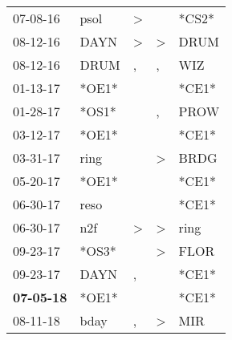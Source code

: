 \begin{supertabular}{p{0.07\textwidth}p{0.06\textwidth}p{0.02\textwidth}p{0.02\textwidth}p{0.06\textwidth}}
          07-08-16\textsuperscript{} &           psol\textsuperscript{} &     \textgreater &                  &                            *CS2* \\
          08-12-16\textsuperscript{} &           DAYN\textsuperscript{} &     \textgreater &     \textgreater &           DRUM\textsuperscript{} \\
          08-12-16\textsuperscript{} &           DRUM\textsuperscript{} &                , &                , &            WIZ\textsuperscript{} \\
          01-13-17\textsuperscript{} &                            *OE1* &                  &                  &                            *CE1* \\
          01-28-17\textsuperscript{} &                            *OS1* &                  &                , &           PROW\textsuperscript{} \\
          03-12-17\textsuperscript{} &                            *OE1* &                  &                  &                            *CE1* \\
          03-31-17\textsuperscript{} &           ring\textsuperscript{} &                  &     \textgreater &           BRDG\textsuperscript{} \\
          05-20-17\textsuperscript{} &                            *OE1* &                  &                  &                            *CE1* \\
          06-30-17\textsuperscript{} &           reso\textsuperscript{} &                  &                  &                            *CE1* \\
          06-30-17\textsuperscript{} &            n2f\textsuperscript{} &     \textgreater &     \textgreater &           ring\textsuperscript{} \\
          09-23-17\textsuperscript{} &                            *OS3* &                  &     \textgreater &           FLOR\textsuperscript{} \\
          09-23-17\textsuperscript{} &           DAYN\textsuperscript{} &                , &                  &                            *CE1* \\
 \textbf{07-05-18\textsuperscript{}} &                            *OE1* &                  &                  &                            *CE1* \\
          08-11-18\textsuperscript{} &           bday\textsuperscript{} &                , &     \textgreater &            MIR\textsuperscript{} \\

\end{supertabular}
